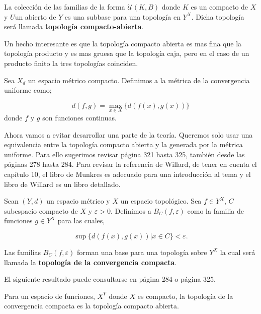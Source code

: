 


\begin{pr}
	La colección de las familias de la forma $\mathcal{U}(K,B)$ donde $K$ es un compacto de $X$ y $U$un abierto de $Y$ es una subbase para una topología en $Y^X$. Dicha topología será llamada \textbf{topología compacto-abierta}.
\end{pr}

\begin{ob}
Un hecho interesante es que la topología compacto abierta es mas fina que la topología producto y es mas gruesa que la topología caja, pero en el caso de un producto finito la tres topologías coinciden.
\end{ob}

\begin{df}
Sea $X_d$ un espacio métrico compacto. Definimos a la métrica de la convergencia uniforme como;

$$d(f,g)= \max_{x \in X}\{d(f(x),g(x)) \}$$
donde $f$ y $g$ son funciones continuas. 
\end{df}


Ahora vamos a evitar desarrollar una parte de la teoría. Queremos solo usar una equivalencia entre la topología compacto abierta y la generada por la métrica uniforme. Para ello sugerimos revisar \cite{top_munk} página 321 hasta 325, también \cite{top_willd} desde las páginas 278 hasta 284. Para revisar la referencia de Willard, de tener en cuenta el capítulo 10, el libro de Munkres es adecuado para una introducción al tema y el libro de Willard es un libro detallado.

\begin{df}
Sean $(Y,d)$ un espacio métrico y $X$ un espacio topológico. Sea $f \in Y^X$, $C$ subespacio compacto de $X$ y $\varepsilon > 0$. Definimos a $B_C(f, \varepsilon)$ como la familia de funciones $g \in Y ^X$ para las cuales,

$$\sup \{d(f(x),g(x))|x \in C \} < \varepsilon.$$

Las familias  $B_C(f,\varepsilon)$ forman una base para una topología sobre $Y^X$ la cual será llamada la \textbf{topología de la convergencia compacta}.  
\end{df}
El siguiente resultado puede consultarse en \cite{top_willd} página 284 o \cite{top_munk} página 325.

\begin{te}
Para un espacio de funciones, $X^Y$ donde $X$ es compacto, la topología de la convergencia compacta es la topología compacto abierta. 
\end{te}


